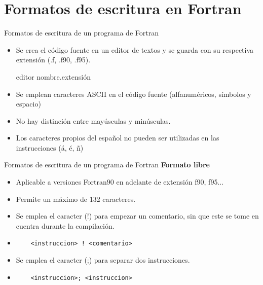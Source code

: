 
\section{Formatos de escritura en Fortran}


\begin{frame}[fragile]{Formatos de escritura de un programa de Fortran}
  \begin{itemize}[<+(1)->]
  \item Se crea el código fuente en un editor de textos y se guarda con su respectiva extensión (.f, .f90, .f95).
    \begin{mintedbash}
      editor nombre.extensión
    \end{mintedbash}
  \item Se emplean caracteres ASCII en el código fuente (alfanuméricos, símbolos y espacio)
  \item No hay distinción entre mayúsculas y minúsculas.
  \item Los caracteres propios del español no pueden ser utilizadas en las instrucciones (á, é, ñ)
  \end{itemize}
\end{frame}

\begin{frame}[fragile]{Formatos de escritura de un programa de Fortran}
 \textbf{Formato libre}
  \begin{itemize}[<+(1)->]
   \item Aplicable a versiones Fortran90 en adelante de extensión f90, f95...
   \item Permite un máximo de 132 caracteres.
   \item Se emplea el caracter (!) para empezar un comentario, sin que este se tome en cuentra durante la compilación.
   \vspace{0.1cm}
   \item []
    \begin{verbatim}
    <instruccion> ! <comentario>
    \end{verbatim}
   \item Se emplea el caracter (;) para separar dos instrucciones.
   \vspace{0.1cm}
   \item []
    \begin{verbatim}
    <instruccion>; <instruccion>
    \end{verbatim}
  \end{itemize}
\end{frame}

